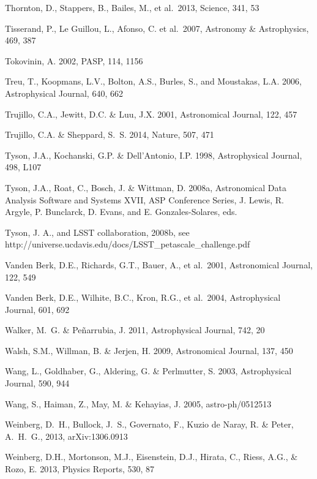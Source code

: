 \documentclass{emulateapj}
\begin{document}
\begin{thebibliography}{}
\bibitem[()]{} Thornton, D., Stappers, B., Bailes, M., et al.~2013, Science, 341, 53

\bibitem[()]{} Tisserand, P., Le Guillou, L., Afonso, C. et al.~2007, Astronomy \& Astrophysics, 469, 387

\bibitem[()]{} Tokovinin, A. 2002, PASP, 114, 1156

\bibitem[()]{} Treu, T., Koopmans, L.V., Bolton, A.S., Burles, S., and
  Moustakas, L.A. 2006, Astrophysical Journal, 640, 662

\bibitem[()]{} Trujillo, C.A., Jewitt, D.C. \& Luu, J.X. 2001, Astronomical Journal, 122, 457

\bibitem[()]{} Trujillo, C.A. \& Sheppard, S.~S. 2014, Nature, 507, 471

\bibitem[()]{} Tyson, J.A., Kochanski, G.P. \& Dell'Antonio, I.P. 1998, Astrophysical Journal, 498, L107

\bibitem[()]{} Tyson, J.A., Roat, C., Bosch, J. \& Wittman, D. 2008a, Astronomical 
             Data Analysis Software and Systems XVII, ASP Conference Series, 
             J. Lewis, R. Argyle, P. Bunclarck, D. Evans, and E. Gonzales-Solares, eds.     

\bibitem[()]{} Tyson, J. A., and LSST collaboration, 2008b, see 
                 http://universe.ucdavis.edu/docs/LSST\_petascale\_challenge.pdf 

\bibitem[()]{} Vanden Berk, D.E., Richards, G.T., Bauer, A., et al.~2001, Astronomical Journal, 122, 549

\bibitem[()]{} Vanden Berk, D.E., Wilhite, B.C., Kron, R.G., et al.~2004, Astrophysical Journal, 601, 692

\bibitem[()]{} Walker, M.~G. \& Pe{\~n}arrubia, J. 2011, Astrophysical Journal, 742, 20


\bibitem[()]{} Walsh, S.M., Willman, B. \& Jerjen, H. 2009, Astronomical Journal, 137, 450

\bibitem[()]{} Wang, L., Goldhaber, G., Aldering, G. \& Perlmutter, S. 2003, Astrophysical Journal, 590, 944

\bibitem[()]{} Wang, S., Haiman, Z., May, M. \& Kehayias, J. 2005, astro-ph/0512513

\bibitem[()]{} Weinberg, D.~H., Bullock, J.~S., Governato, F., Kuzio de Naray, R. \& Peter, A.~H.~G., 2013, arXiv:1306.0913

\bibitem[()]{} Weinberg, D.H., Mortonson, M.J., Eisenstein, D.J.,
  Hirata, C., Riess, A.G., \& Rozo, E. 2013, Physics Reports, 530, 87


\end{thebibliography}
\end{document}
